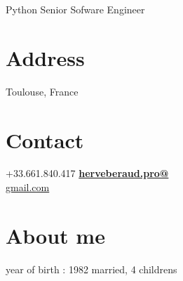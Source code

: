 \documentclass[]{friggeri-cv}
\begin{document}
    {Python Senior Sofware Engineer}


\begin{aside}
    \section{Address}
        Toulouse, France
        ~
    \section{Contact}
        +33.661.840.417
        \href{mailto:herveberaud.pro@gmail.com}{\textbf{herveberaud.pro@}\\gmail.com}
        ~
    \section{About me}
        year of birth : 1982
        married, 4 childrens 
        ~

\end{aside}
\end{document}
